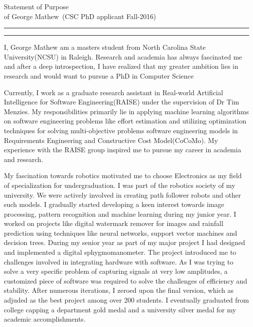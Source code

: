 \documentclass{article}
\newcommand{\soptitle}{Statement of Purpose}
\newcommand{\yourname}{George Mathew}
\begin{document}
\begin{center}\LARGE\soptitle\\
\large of \yourname\ (CSC PhD applicant Fall-2016)
\end{center}

\hrule
\vspace{1pt}
\hrule height 1pt

\bigskip

I, George Mathew am a masters student from North Carolina State University(NCSU) in Raleigh. Research and academia has always fascinated me and after a deep introspection, I have realized that my greater ambition lies in research and would want to pursue a PhD in Computer Science

\bigskip
Currently, I work as a graduate research assistant in Real-world Artificial Intelligence for 
Software Engineering(RAISE) under the supervision of Dr Tim Menzies.
 My responsibilities primarily lie in applying machine learning algorithms on software engineering 
 problems like effort estimation and utilizing optimization techniques for solving multi-objective problems software engineering models in Requirements Engineering and Constructive Cost Model(CoCoMo). My experience with the RAISE group inspired me to pursue my career in academia and research. 

\bigskip

My fascination towards robotics motivated me to choose Electronics as my field of specialization for undergraduation. I was part of the robotics society of my university. We were actively involved in creating path follower robots and other such models. I gradually started developing a keen interest towards image 
processing, pattern recognition and machine learning during my junior year. I worked on 
projects like digital watermark remover for images and rainfall prediction using techniques like neural 
networks, support vector machines and decision trees. During my senior year as part of 
my major project I had designed and implemented a digital sphygmomanometer. The project
introduced me to challenges involved in integrating hardware with software. As I was trying to solve a very specific problem of capturing signals at very low amplitudes, a customized piece of software was required to solve the challenges of efficiency and stability. After numerous iterations, I zeroed upon the final version, which as adjuded as the best project among over 200 students. I eventually graduated from college capping a department gold 
medal and a university silver medal for my academic accomplishments.
\end{document}
